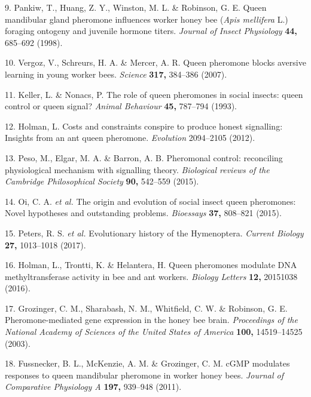 \documentclass[12pt,]{article}
\begin{document}
\hypertarget{ref-Pankiw:1998vta}{}
9. Pankiw, T., Huang, Z. Y., Winston, M. L. \& Robinson, G. E. Queen
mandibular gland pheromone influences worker honey bee (\emph{Apis
mellifera} L.) foraging ontogeny and juvenile hormone titers.
\emph{Journal of Insect Physiology} \textbf{44,} 685--692 (1998).

\hypertarget{ref-Vergoz:2007ej}{}
10. Vergoz, V., Schreurs, H. A. \& Mercer, A. R. Queen pheromone blocks
aversive learning in young worker bees. \emph{Science} \textbf{317,}
384--386 (2007).

\hypertarget{ref-Keller:1993vl}{}
11. Keller, L. \& Nonacs, P. The role of queen pheromones in social
insects: queen control or queen signal? \emph{Animal Behaviour}
\textbf{45,} 787--794 (1993).

\hypertarget{ref-Holman:2012ey}{}
12. Holman, L. Costs and constraints conspire to produce honest
signalling: Insights from an ant queen pheromone. \emph{Evolution}
2094--2105 (2012).

\hypertarget{ref-Peso:2015hx}{}
13. Peso, M., Elgar, M. A. \& Barron, A. B. Pheromonal control:
reconciling physiological mechanism with signalling theory.
\emph{Biological reviews of the Cambridge Philosophical Society}
\textbf{90,} 542--559 (2015).

\hypertarget{ref-Oi:2015go}{}
14. Oi, C. A. \emph{et al.} The origin and evolution of social insect
queen pheromones: Novel hypotheses and outstanding problems.
\emph{Bioessays} \textbf{37,} 808--821 (2015).

\hypertarget{ref-Peters:2017bk}{}
15. Peters, R. S. \emph{et al.} Evolutionary history of the Hymenoptera.
\emph{Current Biology} \textbf{27,} 1013--1018 (2017).

\hypertarget{ref-Holman:2016ea}{}
16. Holman, L., Trontti, K. \& Helantera, H. Queen pheromones modulate
DNA methyltransferase activity in bee and ant workers. \emph{Biology
Letters} \textbf{12,} 20151038 (2016).

\hypertarget{ref-Grozinger:2003er}{}
17. Grozinger, C. M., Sharabash, N. M., Whitfield, C. W. \& Robinson, G.
E. Pheromone-mediated gene expression in the honey bee brain.
\emph{Proceedings of the National Academy of Sciences of the United
States of America} \textbf{100,} 14519--14525 (2003).

\hypertarget{ref-Fussnecker:2011cg}{}
18. Fussnecker, B. L., McKenzie, A. M. \& Grozinger, C. M. cGMP
modulates responses to queen mandibular pheromone in worker honey bees.
\emph{Journal of Comparative Physiology A} \textbf{197,} 939--948
(2011).
\end{document}
